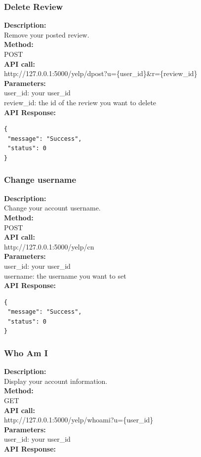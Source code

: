 \documentclass[12pt]{article}
\begin{document}
\subsubsection{Delete Review}
\textbf{Description:}\\
Remove your posted review.\\
\textbf{Method:}\\
POST\\
\textbf{API call:}\\ 
http://127.0.0.1:5000/yelp/dpost?u=\{user\_id\}\&r=\{review\_id\}\\
\textbf{Parameters:}\\
user\_id: your user\_id\\
review\_id: the id of the review you want to delete\\
\textbf{API Response:}

\begin{singlespacing}
\begin{lstlisting}
{
 "message": "Success",
 "status": 0
}
\end{lstlisting}
\end{singlespacing}

\subsubsection{Change username}
\textbf{Description:}\\
Change your account username.\\
\textbf{Method:}\\
POST\\
\textbf{API call:}\\ 
http://127.0.0.1:5000/yelp/cn\\
\textbf{Parameters:}\\
user\_id: your user\_id\\
username: the username you want to set\\
\textbf{API Response:}

\begin{singlespacing}
\begin{lstlisting}
{
 "message": "Success",
 "status": 0
}
\end{lstlisting}
\end{singlespacing}

\subsubsection{Who Am I}
\textbf{Description:}\\
Display your account information.\\
\textbf{Method:}\\
GET\\
\textbf{API call:}\\ 
http://127.0.0.1:5000/yelp/whoami?u=\{user\_id\}\\
\textbf{Parameters:}\\
user\_id: your user\_id\\
\textbf{API Response:}
\end{document}
